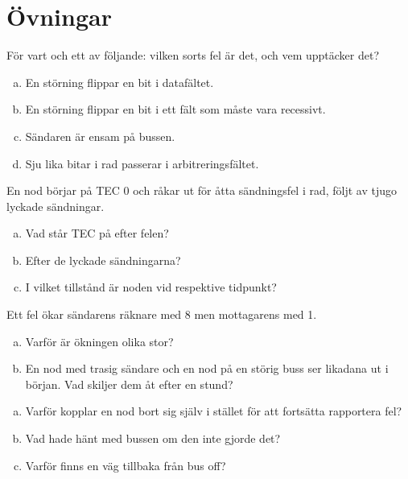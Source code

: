 \section*{Övningar}

\label{ex:6:1}
För vart och ett av följande: vilken sorts fel är det, och vem upptäcker det?
\begin{enumerate}[a)]
  \item En störning flippar en bit i datafältet.
  \item En störning flippar en bit i ett fält som måste vara recessivt.
  \item Sändaren är ensam på bussen.
  \item Sju lika bitar i rad passerar i arbitreringsfältet.
\end{enumerate}

\label{ex:6:2}
En nod börjar på TEC 0 och råkar ut för åtta sändningsfel i rad, följt av tjugo lyckade
sändningar.
\begin{enumerate}[a)]
  \item Vad står TEC på efter felen?
  \item Efter de lyckade sändningarna?
  \item I vilket tillstånd är noden vid respektive tidpunkt?
\end{enumerate}

\label{ex:6:3}
Ett fel ökar sändarens räknare med 8 men mottagarens med 1.
\begin{enumerate}[a)]
  \item Varför är ökningen olika stor?
  \item En nod med trasig sändare och en nod på en störig buss ser likadana ut i början. Vad
    skiljer dem åt efter en stund?
\end{enumerate}

\label{ex:6:4}
\begin{enumerate}[a)]
  \item Varför kopplar en nod bort sig själv i stället för att fortsätta rapportera fel?
  \item Vad hade hänt med bussen om den inte gjorde det?
  \item Varför finns en väg tillbaka från bus off?
\end{enumerate}
